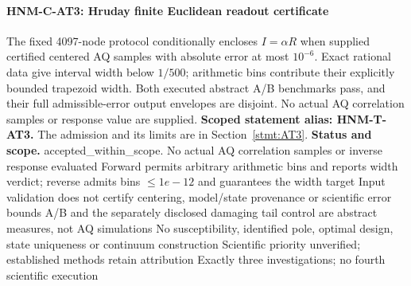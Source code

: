 \paragraph{HNM-C-AT3: Hruday finite Euclidean readout certificate} The fixed 4097-node protocol conditionally encloses $I=\alpha R$ when supplied certified centered AQ samples with absolute error at most $10^{-6}$. Exact rational data give interval width below $1/500$; arithmetic bins contribute their explicitly bounded trapezoid width. Both executed abstract A/B benchmarks pass, and their full admissible-error output envelopes are disjoint. No actual AQ correlation samples or response value are supplied.
\textbf{Scoped statement alias: HNM-T-AT3.} The admission and its limits are in Section~\ref{stmt:AT3}.
\textbf{Status and scope.} accepted\_within\_scope. No actual AQ correlation samples or inverse response evaluated Forward permits arbitrary arithmetic bins and reports width verdict; reverse admits bins \(\le 1e-12\) and guarantees the width target Input validation does not certify centering, model/state provenance or scientific error bounds A/B and the separately disclosed damaging tail control are abstract measures, not AQ simulations No susceptibility, identified pole, optimal design, state uniqueness or continuum construction Scientific priority unverified; established methods retain attribution Exactly three investigations; no fourth scientific execution
